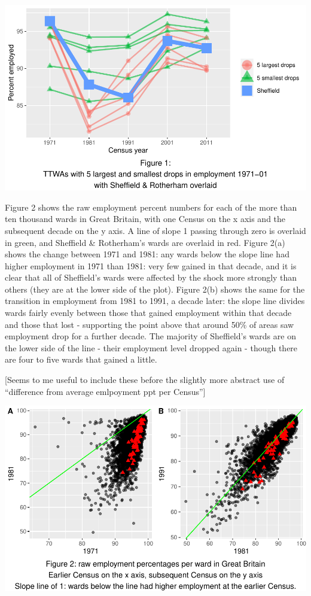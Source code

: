 \documentclass[
]{article}
\begin{document}
\includegraphics{SheffieldScarring_Writeup1_Apr2022_files/figure-latex/unnamed-chunk-2-1.pdf}

Figure 2 shows the raw employment percent numbers for each of the more
than ten thousand wards in Great Britain, with one Census on the x axis
and the subsequent decade on the y axis. A line of slope 1 passing
through zero is overlaid in green, and Sheffield \& Rotherham's wards
are overlaid in red. Figure 2(a) shows the change between 1971 and 1981:
any wards below the slope line had higher employment in 1971 than 1981:
very few gained in that decade, and it is clear that all of Sheffield's
wards were affected by the shock more strongly than others (they are at
the lower side of the plot). Figure 2(b) shows the same for the
transition in employment from 1981 to 1991, a decade later: the slope
line divides wards fairly evenly between those that gained employment
within that decade and those that lost - supporting the point above that
around 50\% of areas saw employment drop for a further decade. The
majority of Sheffield's wards are on the lower side of the line - their
employment level dropped again - though there are four to five wards
that gained a little.

{[}Seems to me useful to include these before the slightly more abstract
use of ``difference from average emlpoyment ppt per Census''{]}

\includegraphics{SheffieldScarring_Writeup1_Apr2022_files/figure-latex/unnamed-chunk-3-1.pdf}
\end{document}
